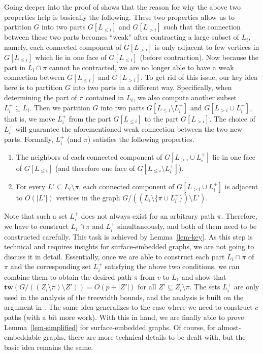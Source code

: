 \documentclass[a4paper,11pt]{article}
\numberwithin{lemma}{section}
\newcommand{\tw}{\mathbf{tw}}
\begin{document}
Going deeper into the proof of \cite{BandyapadhyayLLSJ22} shows that the reason for why the above two properties help is basically the following.
These two properties allow us to partition $G$ into two parts $G[L_{\leq i}]$ and $G[L_{> i}]$ such that the connection between these two parts becomes ``weak'' after contracting a large subset of $L_i$, namely, each connected component of $G[L_{> i}]$ is only adjacent to few vertices in $G[L_{\leq i}]$ which lie in one face of $G[L_{\leq i}]$ (before contraction).
Now because the part in $L_i \cap \pi$ cannot be contracted, we are no longer able to have a weak connection between $G[L_{\leq i}]$ and $G[L_{> i}]$.
To get rid of this issue, our key idea here is to partition $G$ into two parts in a different way.
Specifically, when determining the part of $\pi$ contained in $L_i$, we also compute another subset $L_i^+ \subseteq L_i$.
Then we partition $G$ into two parts $G[L_{\leq i} \setminus L_i^+]$ and $G[L_{> i} \cup L_i^+]$, that is, we move $L_i^+$ from the part $G[L_{\leq i}]$ to the part $G[L_{> i}]$.
The choice of $L_i^+$ will guarantee the aforementioned weak connection between the two new parts.
Formally, $L_i^+$ (and $\pi$) satisfies the following properties.
\begin{enumerate}[label = (\Roman*)]
 \item The neighbors of each connected component of $G[L_{> i} \cup L_i^+]$ lie in one face of $G[L_{\leq i}]$ (and therefore one face of $G[L_{\leq i} \setminus L_i^+]$).
 \item For every $L' \subseteq L_i \setminus \pi$, each connected component of $G[L_{> i} \cup L_i^+]$ is adjacent to $O(|L'|)$ vertices in the graph $G/((L_i \setminus \{\pi \cup L_i^+\}) \setminus L')$.
\end{enumerate}
Note that such a set $L_i^+$ does not always exist for an arbitrary path $\pi$.
Therefore, we have to construct $L_i \cap \pi$ and $L_i^+$ simultaneously, and both of them need to be constructed carefully.
This task is achieved by Lemma~\ref{lem-key}.
As this step is technical and requires insights for surface-embedded graphs, we are not going to discuss it in detail.
Essentially, once we are able to construct each part $L_i \cap \pi$ of $\pi$ and the corresponding set $L_i^+$ satisfying the above two conditions, we can combine them to obtain the desired path $\pi$ from $v$ to $L_1$ and show that $\tw(G/((Z_i \setminus \pi) \setminus Z')) = O(p+|Z'|)$ for all $Z' \subseteq Z_i \setminus \pi$.
The sets $L_i^+$ are only used in the analysis of the treewidth bounds, and the analysis is built on the argument in \cite{BandyapadhyayLLSJ22}.
The same idea generalizes to the case where we need to construct $c$ paths (with a bit more work).
With this in hand, we are finally able to prove Lemma~\ref{lem-simplified} for surface-embedded graphs.
Of course, for almost-embeddable graphs, there are more technical details to be dealt with, but the basic idea remains the same.
\end{document}
